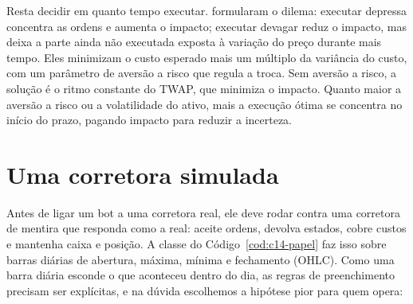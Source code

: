 Resta decidir em quanto tempo executar. \citet{almgren2001} formularam o dilema: executar depressa concentra as ordens e aumenta o impacto; executar devagar reduz o impacto, mas deixa a parte ainda não executada exposta à variação do preço durante mais tempo. Eles minimizam o custo esperado mais um múltiplo da variância do custo, com um parâmetro de aversão a risco que regula a troca. Sem aversão a risco, a solução é o ritmo constante do TWAP, que minimiza o impacto. Quanto maior a aversão a risco ou a volatilidade do ativo, mais a execução ótima se concentra no início do prazo, pagando impacto para reduzir a incerteza.

\section{Uma corretora simulada}
\label{sec:c14-simulador}

Antes de ligar um bot a uma corretora real, ele deve rodar contra uma corretora de mentira que responda como a real: aceite ordens, devolva estados, cobre custos e mantenha caixa e posição. A classe  do Código~\ref{cod:c14-papel} faz isso sobre barras diárias de abertura, máxima, mínima e fechamento (OHLC). Como uma barra diária esconde o que aconteceu dentro do dia, as regras de preenchimento precisam ser explícitas, e na dúvida escolhemos a hipótese pior para quem opera:

